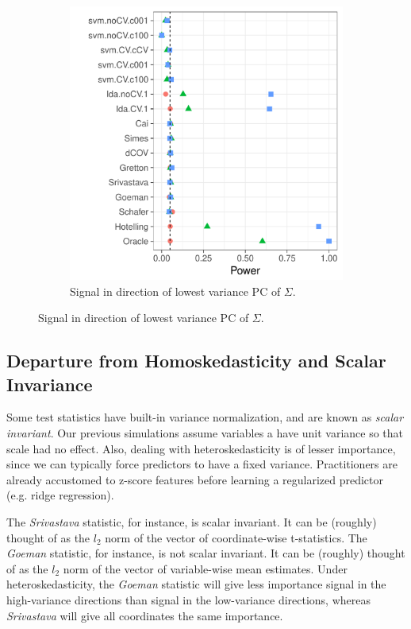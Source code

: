 \documentclass[onecolumn,draftclsnofoot]{IEEEtran}
\begin{document}
\begin{figure}[h]
\begin{subfigure}[t]{.45\columnwidth}
		\includegraphics[width=1\columnwidth]{"art/file17"}
		\caption{Signal in direction of lowest variance PC of $\Sigma$.} 
		\label{fig:dependence_32}
	\end{subfigure}
\end{figure}



\subsection{Departure from Homoskedasticity and Scalar Invariance}

Some test statistics have built-in variance normalization, and are known as \emph{scalar invariant}. 
Our previous simulations assume variables a have unit variance so that scale had no effect. 
Also, dealing with heteroskedasticity is of lesser importance, since we can typically force predictors to have a fixed variance. 
Practitioners are already accustomed to z-score features before learning a regularized predictor (e.g. ridge regression).

The \emph{Srivastava} statistic, for instance, is scalar invariant. 
It can be (roughly) thought of as the $l_2$ norm of the vector of coordinate-wise t-statistics.
The \emph{Goeman} statistic, for instance, is not scalar invariant. 
It can be (roughly) thought of as the $l_2$ norm of the vector of variable-wise mean estimates.
Under heteroskedasticity, the \emph{Goeman} statistic will give less importance signal in the high-variance directions than signal in the low-variance directions, whereas \emph{Srivastava} will give all coordinates the same importance. 
\end{document}
